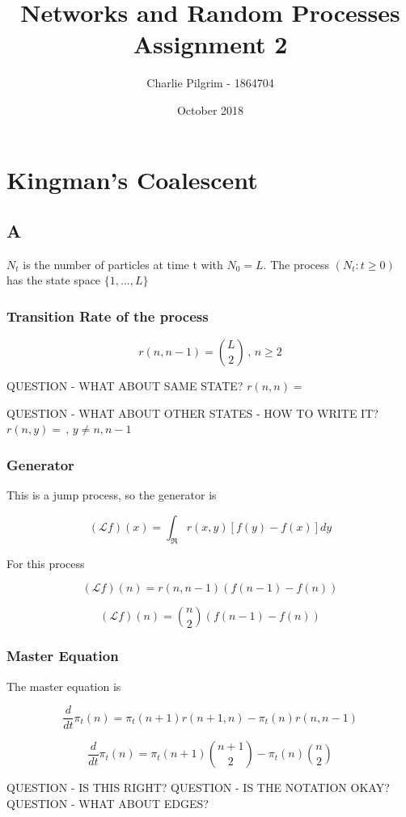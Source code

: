 \documentclass{article}
\title{Networks and Random Processes Assignment 2}
\author{Charlie Pilgrim - 1864704}
\date{October 2018}
\begin{document}
\maketitle


\section{Kingman's Coalescent}

\subsection{A}

$N_t$ is the number of particles at time t with $N_0=L$. The process $(N_t : t \geq 0)$ has the state space $\{1,...,L\}$

\subsubsection{Transition Rate of the process}

$$r(n,n-1) = {L\choose 2} \, , \, n \geq 2$$

QUESTION - WHAT ABOUT SAME STATE?
$r(n,n) = $

QUESTION - WHAT ABOUT OTHER STATES - HOW TO WRITE IT?
$r(n, y) = \, , \, y \neq n,n-1$

\subsubsection{Generator}

This is a jump process, so the generator is

$$(\mathcal{L}f)(x) = \int_{\Re} r(x,y)[f(y)-f(x)]dy$$

For this process

$$(\mathcal{L}f)(n) = r(n,n-1)(f(n-1)-f(n))$$

$$(\mathcal{L}f)(n) = {n\choose 2} (f(n-1)-f(n))$$

\subsubsection{Master Equation}

The master equation is

$$\frac{d}{dt} \pi_t(n) = \pi_t(n+1)r(n+1,n) - \pi_t(n)r(n,n-1)$$

$$\frac{d}{dt} \pi_t(n) = \pi_t(n+1){n+1\choose 2} - \pi_t(n) {n \choose 2}$$

QUESTION - IS THIS RIGHT?
QUESTION - IS THE NOTATION OKAY?
QUESTION - WHAT ABOUT EDGES? 
\end{document}

